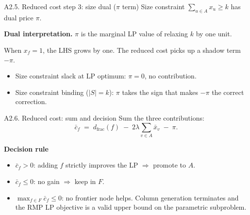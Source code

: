 \documentclass{beamer}
\begin{document}
\begin{frame}{A2.5. Reduced cost step 3: size dual ($\pi$ term)}
  Size constraint $\sum_{u \in A} x_u \ge k$ has dual price $\pi$.

  \vfill

  \textbf{Dual interpretation.} $\pi$ is the marginal LP value of relaxing $k$ by one unit.

  \vfill

  When $x_f = 1$, the LHS grows by one. The reduced cost picks up a shadow term $-\pi$.

  \vfill

  \begin{itemize}
    \item Size constraint slack at LP optimum: $\pi = 0$, no contribution.
    \item Size constraint binding ($|S| = k$): $\pi$ takes the sign that makes $-\pi$ the correct correction.
  \end{itemize}
\end{frame}

\begin{frame}{A2.6. Reduced cost: sum and decision}
  Sum the three contributions:
  \[
    \bar{c}_f \;=\; d_{\mathrm{frac}}(f) \;-\; 2\lambda \sum_{v \in A} \bar{x}_v \;-\; \pi.
  \]

  \vfill

  \textbf{Decision rule}
  \begin{itemize}
    \item $\bar{c}_f > 0$: adding $f$ strictly improves the LP $\Rightarrow$ promote to $A$.
    \item $\bar{c}_f \le 0$: no gain $\Rightarrow$ keep in $F$.
    \item $\max_{f \in F} \bar{c}_f \le 0$: no frontier node helps. Column generation terminates and the RMP LP objective is a valid upper bound on the parametric subproblem.
  \end{itemize}
\end{frame}

\end{document}
